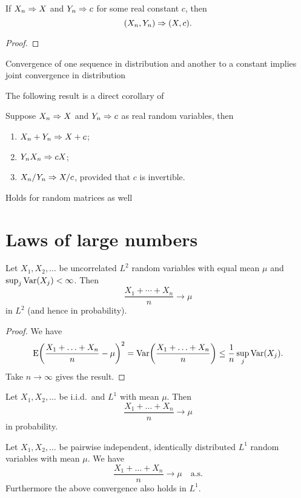 \begin{lem}
    If $X_n \Rightarrow X$ and $Y_n \Rightarrow c$ for some real constant $c$, then \[
        (X_n,Y_n) \Rightarrow (X,c).
    \]
\end{lem}
\begin{proof}
    
\end{proof}

Convergence of one sequence in distribution and another to a constant implies joint convergence in distribution

The following result is a direct corollary of 

\begin{namedthm}
    Suppose $X_n \Rightarrow X$ and $Y_n \Rightarrow c$ as real random variables, then \begin{enumerate}
        \item $X_n + Y_n \Rightarrow X + c$;
        \item $Y_nX_n\Rightarrow cX$;
        \item $X_n/Y_n \Rightarrow X/c$, provided that $c$ is invertible.
    \end{enumerate}
\end{namedthm}

Holds for random matrices as well

\section{Laws of large numbers}
\begin{namedthm}
    Let $X_1,X_2,\dotsc$ be uncorrelated $L^2$ random variables with equal mean $\mu$ and $\sup_j\operatorname{Var}(X_j) < \infty$. Then \[
        \frac{X_1 + \dotsb + X_n}{n} \to \mu 
    \] in $L^2$ (and hence in probability).
\end{namedthm}
\begin{proof}
    We have \[
        \mathop{}\!\mathrm{E} \biggl(\frac{X_1+\dotsc+X_n}{n} - \mu\biggr)^2 = \operatorname{Var}\biggl(\frac{X_1+\dotsc+X_n}{n}\biggr) \leq \frac{1}{n} \sup_j \operatorname{Var}(X_j).
    \] Take $n \to \infty$ gives the result.
\end{proof}

\begin{namedthm}
    Let $X_1,X_2,\dotsc$ be i.i.d.\ and $L^1$ with mean $\mu$. Then \[
        \frac{X_1 + \dotsc + X_n}{n} \to \mu
    \] in probability.
\end{namedthm}

\begin{namedthm} \label{thm:SLLN}
    Let $X_1,X_2,\dotsc$ be pairwise independent, identically distributed $L^1$ random variables with mean $\mu$. We have \[
        \frac{X_1 + \dotsc + X_n}{n} \to \mu \quad \text{a.s.}
    \]
    Furthermore the above convergence also holds in $L^1$.
\end{namedthm}

